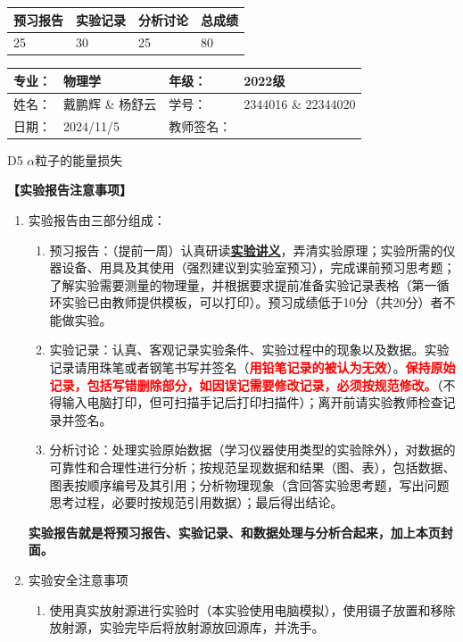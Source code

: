 \documentclass[dvipsnames, svgnames,a4paper,11pt]{article}
\begin{document}
\begin{table}
	\renewcommand\arraystretch{1.7}
	\begin{tabularx}{\textwidth}{
		|X|X|X|X
		|X|X|X|X|}
	\hline
	\multicolumn{2}{|c|}{预习报告}&\multicolumn{2}{|c|}{实验记录}&\multicolumn{2}{|c|}{分析讨论}&\multicolumn{2}{|c|}{总成绩}\\
	\hline
	\LARGE25 & & \LARGE30 & & \LARGE25 & & \LARGE80 & \\
	\hline
	\end{tabularx}
\end{table}


\begin{table}
	\renewcommand\arraystretch{1.7}
	\begin{tabularx}{\textwidth}{|X|X|X|X|}
	\hline
	专业：& 物理学 &年级：& 2022级\\
	\hline
	姓名：& 戴鹏辉 \& 杨舒云  & 学号： & 2344016 \& 22344020 \\
	\hline
	日期：& 2024/11/5 & 教师签名：& \\
	\hline
	\end{tabularx}
\end{table}

\begin{center}
	\LARGE D5 \quad $\alpha$粒子的能量损失
\end{center}

\textbf{【实验报告注意事项】}
\begin{enumerate}
	\item 实验报告由三部分组成：
	\begin{enumerate}
		\item 预习报告：（提前一周）认真研读\underline{\textbf{实验讲义}}，弄清实验原理；实验所需的仪器设备、用具及其使用（强烈建议到实验室预习），完成课前预习思考题；了解实验需要测量的物理量，并根据要求提前准备实验记录表格（第一循环实验已由教师提供模板，可以打印）。预习成绩低于10分（共20分）者不能做实验。
	    \item 实验记录：认真、客观记录实验条件、实验过程中的现象以及数据。实验记录请用珠笔或者钢笔书写并签名（\textcolor{red}{\textbf{用铅笔记录的被认为无效}}）。\textcolor{red}{\textbf{保持原始记录，包括写错删除部分，如因误记需要修改记录，必须按规范修改。}}（不得输入电脑打印，但可扫描手记后打印扫描件）；离开前请实验教师检查记录并签名。
	    \item 分析讨论：处理实验原始数据（学习仪器使用类型的实验除外），对数据的可靠性和合理性进行分析；按规范呈现数据和结果（图、表），包括数据、图表按顺序编号及其引用；分析物理现象（含回答实验思考题，写出问题思考过程，必要时按规范引用数据）；最后得出结论。
	\end{enumerate}
	\textbf{实验报告就是将预习报告、实验记录、和数据处理与分析合起来，加上本页封面。}
	\item 实验安全注意事项
		\begin{enumerate}[label=\roman*.]
			\item 使用真实放射源进行实验时（本实验使用电脑模拟），使用镊子放置和移除放射源，实验完毕后将放射源放回源库，并洗手。
		\end{enumerate}
\end{enumerate}
\end{document}
